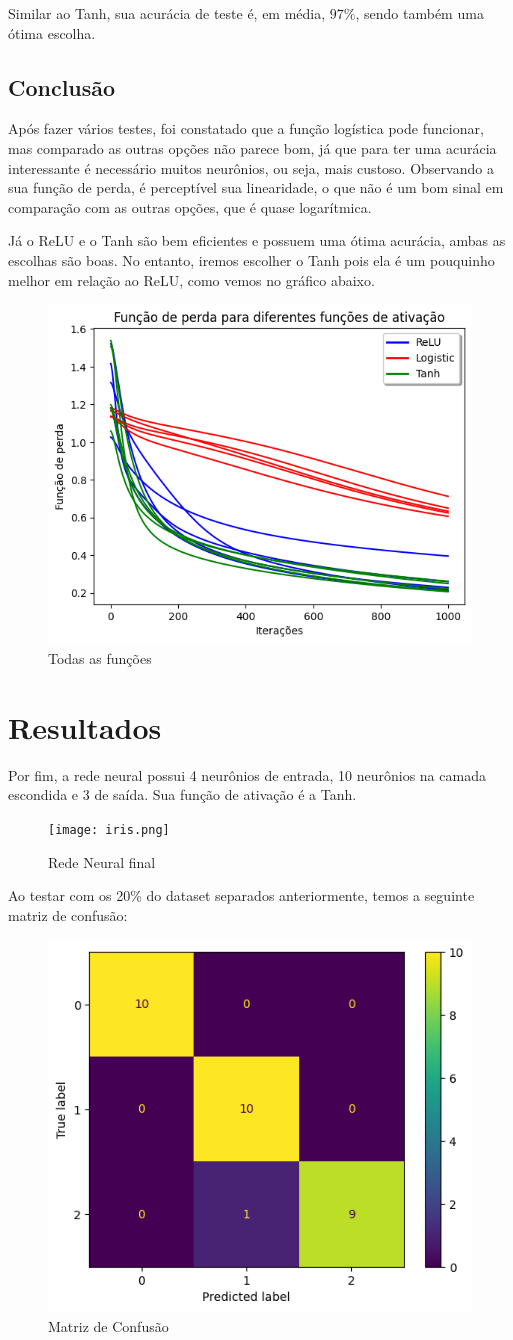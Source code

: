 \documentclass{article}
\begin{document}
Similar ao Tanh, sua acurácia de teste é, em média, $97\%$, sendo também uma ótima escolha.

\subsection{Conclusão}
Após fazer vários testes, foi constatado que a função logística pode funcionar, mas comparado as outras opções não parece bom, já que para ter uma acurácia interessante é necessário muitos neurônios, ou seja, mais custoso. Observando a sua função de perda, é perceptível sua linearidade, o que não é um bom sinal em comparação com as outras opções, que é quase logarítmica.

Já o ReLU e o Tanh são bem eficientes e possuem uma ótima acurácia, ambas as escolhas são boas. No entanto, iremos escolher o Tanh pois ela é um pouquinho melhor em relação ao ReLU, como vemos no gráfico abaixo.
\begin{figure}[ht!]
    \centering
    \includegraphics[width=0.5\linewidth]{diff_loss.png}
    \caption{Todas as funções}
    \label{fig:enter-label}
\end{figure}

\newpage
\section{Resultados}

Por fim, a rede neural possui 4 neurônios de entrada, 10 neurônios na camada escondida e 3 de saída. Sua função de ativação é a Tanh.

\begin{figure}[ht!]
    \centering
    \texttt{[image: iris.png]}
    \caption{Rede Neural final}
\end{figure}

Ao testar com os 20\% do dataset separados anteriormente, temos a seguinte matriz de confusão:

\begin{figure}[ht!]
    \centering
    \includegraphics[width=0.5\linewidth]{final_conf.png}
    \caption{Matriz de Confusão}
\end{figure}
\end{document}

